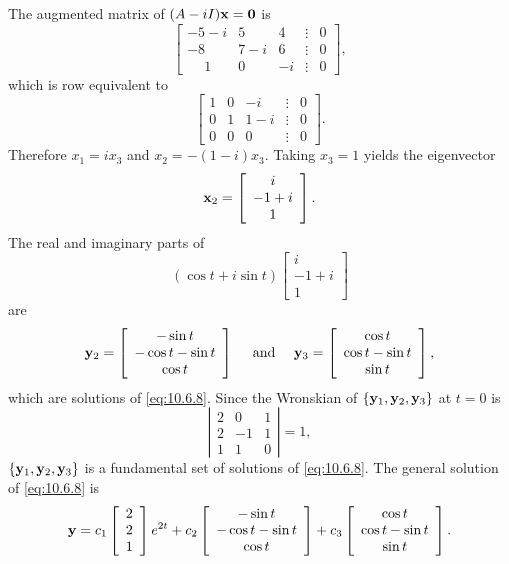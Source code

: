 \begin{examplesolution}
The augmented matrix of $(A-iI){\bf x=0}$ is
\[
  \left[
  \begin{array}{ccrccc}
    -5-i         & 5   & 4  & \vdots & 0 \\
    -8           & 7-i & 6  & \vdots & 0 \\
    \phantom{-}1 & 0   & -i & \vdots & 0
  \end{array}\right],
\]
which is row equivalent to
\[
  \left[
  \begin{array}{ccccc}
    1 & 0 & -i  & \vdots & 0 \\
    0 & 1 & 1-i & \vdots & 0 \\
    0 & 0 & 0   & \vdots & 0
  \end{array}\right].
\]
Therefore $x_{1}=ix_{3}$ and $x_{2}=-(1-i)x_{3}$. Taking $x_{3}=1$ yields the eigenvector
\[
  {\bf x}_{2}=\left[
  \begin{array}{c}
    i    \\
    -1+i \\
    1
  \end{array}
  \right].
\]
The real and imaginary parts of
\[
  (\cos t+i\sin t)\left[
  \begin{array}{c}
    i    \\
    -1+i \\
    1
  \end{array}\right]
\]
are
\[
  {\bf y}_{2}= \left[
  \begin{array}{c}
    -\sin t        \\
    -\cos t-\sin t \\
    \cos t
  \end{array}\right] \quad\mbox{ and }\quad{\bf y}_{3}=\left[
  \begin{array}{c}
    \cos t        \\
    \cos t-\sin t \\
    \sin t
  \end{array}\right],
\]
which are solutions of \eqref{eq:10.6.8}. Since the Wronskian of
$\{{\bf y}_{1},{\bf y}_{2},{\bf y}_{3}\}$ at $t=0$ is
\[
  \left|
  \begin{array}{rrr}
    2 & 0  & 1 \\
    2 & -1 & 1 \\
    1 & 1  & 0
  \end{array}\right|=1,
\]
$\{{\bf y}_{1},{\bf y}_{2},{\bf y}_{3}\}$ is a fundamental set of solutions of \eqref{eq:10.6.8}.
The general solution of \eqref{eq:10.6.8} is
\[
  {\bf y}=c_{1}\left[\begin{array}{r}2\\2\\1\end{array}\right]e^{2t}+c_{2}\left[
  \begin{array}{c}
    -\sin t        \\
    -\cos t-\sin t \\
    \cos t
  \end{array}\right] +c_{3}\left[
  \begin{array}{c}
    \cos t        \\
    \cos t-\sin t \\
    \sin t
  \end{array}\right].
\]
\end{examplesolution}

